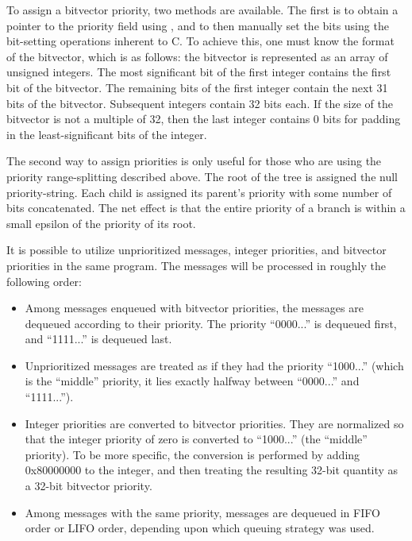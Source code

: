 To assign a bitvector priority, two methods are available.  The
first is to obtain a pointer to the priority field using  ,
and to then manually set the bits using the bit-setting operations
inherent to C.  To achieve this, one must know the format
 of the
bitvector, which is as follows: the bitvector is represented as an
array of unsigned integers.  The most significant bit of the first
integer contains the first bit of the bitvector.  The remaining bits
of the first integer contain the next 31 bits of the bitvector.
Subsequent integers contain 32 bits each.  If the size of the
bitvector is not a multiple of 32, then the last integer contains 0
bits for padding in the least-significant bits of the integer.

The second way to assign priorities is only useful for those who are
using the priority range-splitting
described above.  The root of the tree is assigned the null
priority-string.  Each child is assigned its parent's priority with
some number of bits concatenated.  The net effect is that the entire
priority of a branch is within a small epsilon of the priority of its
root.

It is possible to utilize unprioritized messages, integer priorities,
and bitvector priorities in the same program.  The messages will be
processed in roughly the following order:

\begin{itemize}

\item Among messages enqueued with bitvector priorities, the
messages are dequeued according to their priority.  The
priority ``0000...'' is dequeued first, and ``1111...'' is
dequeued last.

\item Unprioritized messages are treated as if they had the
priority ``1000...'' (which is the ``middle'' priority, it
lies exactly halfway between ``0000...'' and ``1111...'').
 
\item Integer priorities are converted to bitvector priorities.  They
are normalized so that the integer priority of zero is converted to
``1000...'' (the ``middle'' priority).  To be more specific, the
conversion is performed by adding 0x80000000 to the integer, and then
treating the resulting 32-bit quantity as a 32-bit bitvector priority.

\item Among messages with the same priority, messages are
dequeued in FIFO order or LIFO order, depending upon which
queuing strategy was used.

\end{itemize} 


